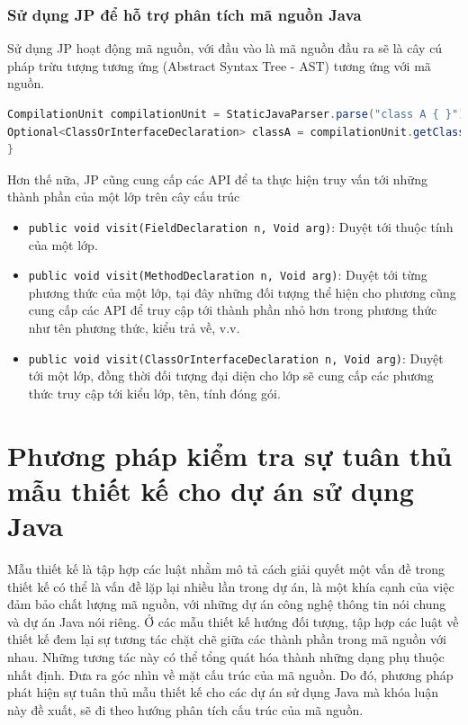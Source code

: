 \documentclass[12pt]{report}
\begin{document}
\subsection{Sử dụng JP để hỗ trợ phân tích mã nguồn Java}
Sử dụng JP hoạt động mã nguồn, với đầu vào là mã nguồn đầu ra sẽ là cây cú pháp trừu tượng tương ứng (Abstract Syntax Tree - AST) tương ứng với mã nguồn.
\begin{lstlisting}[language=Java,
caption={Sử dụng API của JS Core để tạo cây cú pháp trúc trừu tượng},label={code:jdt-ast-gen}]
CompilationUnit compilationUnit = StaticJavaParser.parse("class A { }");
Optional<ClassOrInterfaceDeclaration> classA = compilationUnit.getClassByName("A");
}
\end{lstlisting}
Hơn thế nữa, JP cũng cung cấp các API để ta thực hiện truy vấn tới những thành phần của một lớp trên cây cấu trúc
\begin{itemize}
	\item \texttt{public void visit(FieldDeclaration n, Void arg)}: Duyệt tới thuộc tính của một lớp.
	\item \texttt{public void visit(MethodDeclaration n, Void arg)}: Duyệt tới từng phương thức của một lớp, tại đây những đối tượng thể hiện cho phương cũng cung cấp các API để truy cập tới thành phần nhỏ hơn trong phương thức như tên phương thức, kiểu trả về, v.v.
	\item \texttt{public void visit(ClassOrInterfaceDeclaration n, Void arg)}: Duyệt tới một lớp, đồng thời đối tượng đại diện cho lớp sẽ cung cấp các phương thức truy cập tới kiểu lớp, tên, tính đóng gói.
\end{itemize}
\chapter{Phương pháp kiểm tra sự tuân thủ mẫu thiết kế cho dự án sử dụng Java}\noindent Mẫu thiết kế là tập hợp các luật nhằm mô tả cách giải quyết một vấn đề trong thiết kế có thể là vấn đề lặp lại nhiều lần trong dự án, là một khía cạnh của việc đảm bảo chất lượng mã nguồn, với những dự án công nghệ thông tin nói chung và dự án Java nói riêng. Ở các mẫu thiết kế hướng đối tượng, tập hợp các luật về thiết kế đem lại sự tương tác chặt chẽ giữa các thành phần trong mã nguồn với nhau. Những tương tác này có thể tổng quát hóa thành những dạng phụ thuộc nhất định. Đưa ra góc nhìn về mặt cấu trúc của mã nguồn. Do đó, phương pháp phát hiện sự tuân thủ mẫu thiết kế cho các dự án sử dụng Java mà khóa luận này đề xuất, sẽ đi theo hướng phân tích cấu trúc của mã nguồn.
\end{document}
